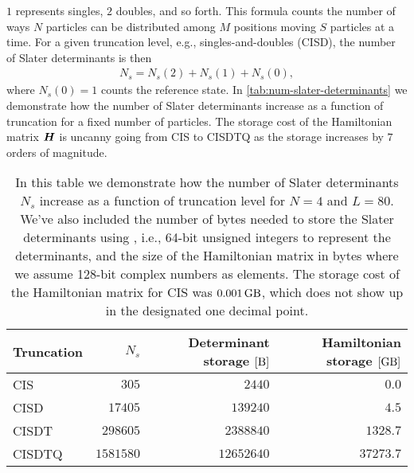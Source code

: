             $1$ represents singles, $2$ doubles, and so forth.
            This formula counts the number of ways $N$ particles can be
            distributed among $M$ positions moving $S$ particles at a time.
            For a given truncation level, e.g., singles-and-doubles (CISD), the
            number of Slater determinants is then
            \begin{align}
                N_s = N_s(2) + N_s(1) + N_s(0),
            \end{align}
            where $N_s(0) = 1$ counts the reference state.
            In \autoref{tab:num-slater-determinants} we demonstrate how the
            number of Slater determinants increase as a function of truncation
            for a fixed number of particles.
            The storage cost of the Hamiltonian matrix $\boldsymbol{H}$ is uncanny
            going from CIS to CISDTQ as the storage increases by $7$ orders of
            magnitude.
            \begin{table}
                \centering
                \caption{In this table we demonstrate how the number of
                Slater determinants $N_s$ increase as a function of truncation
                level for $N = 4$ and $L = 80$.
                We've also included the number of bytes needed to store the
                Slater determinants using , i.e., 64-bit
                unsigned integers to represent the determinants, and the size of
                the Hamiltonian matrix in bytes where we assume 128-bit complex
                numbers as elements.
                The storage cost of the Hamiltonian matrix for CIS was
                $\SI{0.001}{\giga\byte}$, which does not show up in the
                designated one decimal point.}
                \renewcommand{\arraystretch}{1.3}
                \begin{tabular}{@{}lrrr@{}}
                    \toprule
                    Truncation & $N_s$ & Determinant storage $[\si{\byte}]$
                    & Hamiltonian storage $[\si{\giga\byte}]$ \\
                    \midrule
                    CIS & $305$ & $2440$ & $0.0$ \\
                    CISD & $17405$ & $139240$ & $4.5$ \\
                    CISDT & $298605$ & $2388840$ & $1328.7$ \\
                    CISDTQ & $1581580$ & $12652640$ & $37273.7$ \\
                    \bottomrule
                \end{tabular}
                \label{tab:num-slater-determinants}
            \end{table}

